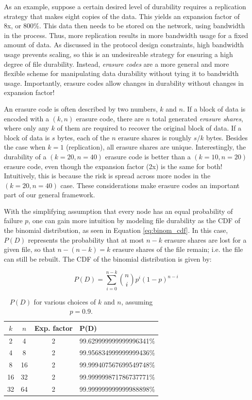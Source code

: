 \documentclass[a4paper,10pt]{article} \usepackage[utf8]{inputenc}
\begin{document}
As an example, suppose a certain desired level of durability requires a
replication strategy that makes eight copies of the data. This yields an
expansion factor of 8x, or 800\%. This data then needs to be stored on the
network, using bandwidth in the process. Thus, more replication results in more
bandwidth usage for a fixed amount of data. As discussed in the protocol design
constraints, high bandwidth usage prevents scaling, so this is an undesireable
strategy for ensuring a high degree of file durability. Instead, {\em erasure
codes} are a more general and more flexible scheme for manipulating data
durability without tying it to bandwidth usage. Importantly, erasure codes allow
changes in durability without changes in expansion factor!

An erasure code is often described by two numbers, $k$ and $n$. If a block of
data is encoded with a $(k,n)$ erasure code, there are $n$ total generated {\em
erasure shares}, where only any $k$ of them are required to recover the original
block of data. If a block of data is $s$ bytes, each of the $n$ erasure shares
is roughly $s/k$ bytes. Besides the case when $k=1$ (replication), all erasure
shares are unique. Interestingly, the durability of a $(k=20,n=40)$ erasure code
is better than a $(k=10,n=20)$ erasure code, even though the expansion factor
(2x) is the same for both! Intuitively, this is because the risk is spread
across more nodes in the $(k=20,n=40)$ case. These considerations make erasure
codes an important part of our general framework.

With the simplifying assumption that every node has an equal probability of
failure $p$, one can gain more intuition by modeling file durability as the CDF
of the binomial distribution, as seen in Equation \eqref{eq:binom_cdf}. In this
case, $P(D)$ represents the probability that at most $n-k$ erasure shares are
lost for a given file, so that $n-(n-k)=k$ erasure shares of the file remain;
i.e. the file can still be rebuilt. The CDF of the binomial distribution is
given by:

\begin{equation} P(D) = \sum_{i=0}^{n-k} \binom{n}{i} p^i
(1-p)^{n-i}\label{eq:binom_cdf}
\end{equation}

\begin{table}[b]
\centering
\begin{tabular}{c c c l}
$k$ & $n$ & Exp. factor & P(D) \\
\hline 2 & 4 & 2 & 99.629999999999996341\%\\
4 & 8 & 2 & 99.956834999999999436\%\\
8 & 16 & 2 & 99.999407567699549748\%\\
16 & 32 & 2 & 99.999999871786737771\%\\
32 & 64 & 2 & 99.999999999999988898\%\\
\end{tabular}
\caption{$P(D)$ for various choices of $k$ and $n$, assuming $p=0.9$.}
\end{table}
\end{document}
